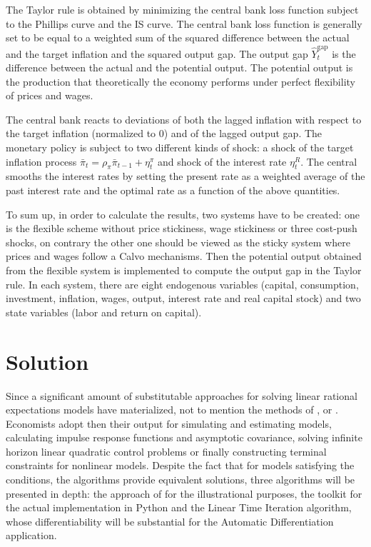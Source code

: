 \documentclass{pracamgr}
\numberwithin{equation}{section}
\begin{document}
The Taylor rule is obtained by minimizing the central bank loss function subject to the Phillips curve and the IS curve. The central bank loss function is generally set to be equal to a weighted sum of the squared difference between the actual and the target inflation and the squared output gap. The output gap $\hat{Y}_{t}^{\text{gap}}$ is the difference between the actual and the potential output. The potential output is the production that theoretically the economy performs under perfect flexibility of prices and wages.

The central bank reacts to deviations of both the lagged inflation with respect to the target inflation (normalized to 0) and of the lagged output gap. The monetary policy is subject to two different kinds of shock: a shock of the target inflation process $ \bar{\pi}_{t} = \rho_{\pi} \bar{\pi}_{t-1} + \eta_{t}^{\pi}$ and shock
of the interest rate $\eta_{t}^{R}$. The central smooths the interest rates by setting the present rate as a weighted average of the past interest rate and the optimal rate as a function of the above quantities.

To sum up, in order to calculate the results, two systems have to be created: one is the flexible scheme without price stickiness, wage stickiness or three cost-push shocks, on contrary the other one should be viewed as the sticky system where prices and wages follow a Calvo mechanisms. Then the potential output obtained from the flexible system is implemented to compute the output gap in the Taylor rule. In each system, there are eight endogenous variables (capital, consumption, investment, inflation, wages, output, interest rate and real capital stock) and two state variables (labor and return on capital).

\chapter{Solution}

Since \citet{blanchard1980solution} a significant amount of substitutable approaches for solving linear rational expectations models have materialized, not to mention the methods of \citet{uhlig1998toolkit}, \citet{klein2000using} or \citet{sims2002solving}. Economists adopt then their output for simulating and estimating models, calculating impulse response functions and asymptotic covariance, solving infinite horizon linear quadratic control problems or finally constructing terminal constraints for nonlinear models. Despite the fact that for models satisfying the \citet{blanchard1980solution} conditions, the algorithms provide equivalent solutions, three algorithms will be presented in depth: the approach of \citet{klein2000using} for the illustrational purposes, the \citet{uhlig1998toolkit} toolkit for the actual implementation in Python and the Linear Time Iteration algorithm, whose differentiability will be substantial for the Automatic Differentiation application.
\end{document}
